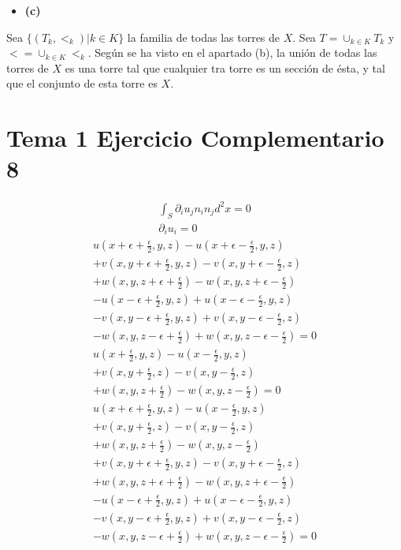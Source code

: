\documentclass{article}
\begin{document}
\begin{itemize}
\item \bf (c) \rm
\end{itemize}
Sea $\{(T_k,<_k)|k\in K\}$ la familia de todas las torres de $X$. Sea $T=\cup_{k\in K}T_k$ y $<=\cup_{k\in K}<_k$. Según se ha visto en el apartado (b), la unión de todas las torres de $X$ es una torre tal que cualquier tra torre es un sección de ésta, y tal que el conjunto de esta torre es $X$. 
\section{Tema 1 Ejercicio Complementario 8}







\begin{eqnarray}
\int_S \partial_i u_j n_i n_j d^2 x=0 \nonumber\\
\partial_i u_i=0 \nonumber
\end{eqnarray}
\begin{eqnarray}
u(x+\epsilon+\frac{\epsilon}{2},y,z)-u(x+\epsilon-\frac{\epsilon}{2},y,z)\nonumber\\+v(x,y+\epsilon+\frac{\epsilon}{2},y,z)-v(x,y+\epsilon-\frac{\epsilon}{2},z)\nonumber\\+w(x,y,z+\epsilon+\frac{\epsilon}{2})-w(x,y,z+\epsilon-\frac{\epsilon}{2})\nonumber\\
-u(x-\epsilon+\frac{\epsilon}{2},y,z)+u(x-\epsilon-\frac{\epsilon}{2},y,z)\nonumber\\-v(x,y-\epsilon+\frac{\epsilon}{2},y,z)+v(x,y-\epsilon-\frac{\epsilon}{2},z)\nonumber\\-w(x,y,z-\epsilon+\frac{\epsilon}{2})+w(x,y,z-\epsilon-\frac{\epsilon}{2})=0\nonumber\\
 u(x+\frac{\epsilon}{2},y,z)-u(x-\frac{\epsilon}{2},y,z) \nonumber\\
+v(x,y+\frac{\epsilon}{2},z)-v(x,y-\frac{\epsilon}{2},z)\nonumber\\
+w(x,y,z+\frac{\epsilon}{2})-w(x,y,z-\frac{\epsilon}{2})=0\nonumber
\end{eqnarray}
\begin{eqnarray}
u(x+\epsilon+\frac{\epsilon}{2},y,z)-u(x-\frac{\epsilon}{2},y,z) \nonumber\\
+v(x,y+\frac{\epsilon}{2},z)-v(x,y-\frac{\epsilon}{2},z)\nonumber\\
+w(x,y,z+\frac{\epsilon}{2})-w(x,y,z-\frac{\epsilon}{2})\nonumber\\
+v(x,y+\epsilon+\frac{\epsilon}{2},y,z)-v(x,y+\epsilon-\frac{\epsilon}{2},z)\nonumber\\+w(x,y,z+\epsilon+\frac{\epsilon}{2})-w(x,y,z+\epsilon-\frac{\epsilon}{2})\nonumber\\
-u(x-\epsilon+\frac{\epsilon}{2},y,z)+u(x-\epsilon-\frac{\epsilon}{2},y,z)\nonumber\\-v(x,y-\epsilon+\frac{\epsilon}{2},y,z)+v(x,y-\epsilon-\frac{\epsilon}{2},z)\nonumber\\-w(x,y,z-\epsilon+\frac{\epsilon}{2})+w(x,y,z-\epsilon-\frac{\epsilon}{2})=0\nonumber
\end{eqnarray}
\end{document}
